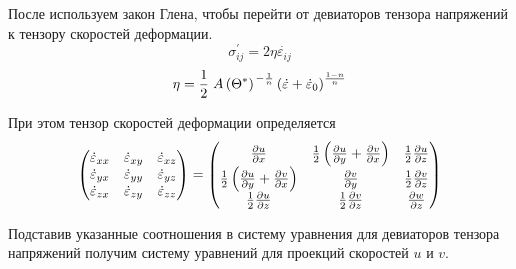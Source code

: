 После используем закон Глена, чтобы перейти от 
девиаторов тензора напряжений к тензору скоростей
деформации.
\begin{equation*}
    \sigma^{'}_{ij}
    =
    2
    \eta
    \dot{\varepsilon_{ij}}
\end{equation*}
\begin{equation*}
    \eta
    =
    \frac{1}{2}
    \left.
        A\left( \Theta^{*} \right)
    \right.^{-\frac{1}{n}}
    \left(
        \dot{\varepsilon}
        +
        \dot{\varepsilon}_0
    \right)^{\frac{1-n}{n}}
\end{equation*}

При этом тензор скоростей деформации определяется 
\begin{equation*}
    \begin{pmatrix}
        \dot{\varepsilon}_{xx}
        &
        \dot{\varepsilon}_{xy}
        &
        \dot{\varepsilon}_{xz}
    \\
        \dot{\varepsilon}_{yx}
        &
        \dot{\varepsilon}_{yy}
        &
        \dot{\varepsilon}_{yz}
    \\
        \dot{\varepsilon}_{zx}
        &
        \dot{\varepsilon}_{zy}
        &
        \dot{\varepsilon}_{zz}
    \end{pmatrix}
    =
    \begin{pmatrix}
        \frac{\partial u}{\partial x}
        &
        \frac{1}{2}
        \left(
            \frac
                {\partial u}
                {\partial y}
            +
            \frac
                {\partial v}
                {\partial x}
        \right)
        &
        \frac{1}{2}
        \frac
            {\partial u}
            {\partial z}
    \\
        \frac{1}{2}
        \left(
            \frac
                {\partial u}
                {\partial y}
            +
            \frac
                {\partial v}
                {\partial x}
        \right)
        &
        \frac{\partial v}{\partial y}
        &
        \frac{1}{2}
        \frac
            {\partial v}
            {\partial z}
    \\
        \frac{1}{2}
        \frac
            {\partial u}
            {\partial z}
        &
        \frac{1}{2}
        \frac
            {\partial v}
            {\partial z}
        &
        \frac
            {\partial w}
            {\partial z}
    \end{pmatrix}
\end{equation*}

Подставив указанные соотношения в систему уравнения для
девиаторов тензора напряжений получим систему уравнений
для проекций скоростей $u$ и $v$.

